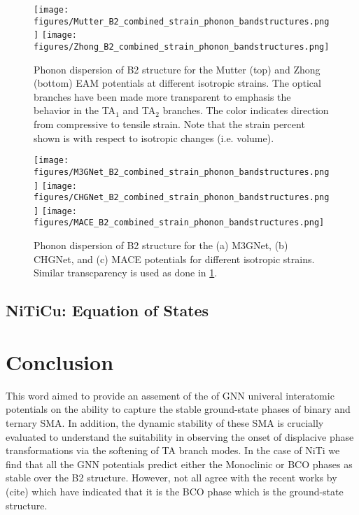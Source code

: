 \documentclass[preprint]{elsarticle}
\begin{document}
\begin{figure}[ht!]
    \begin{centering}
        \texttt{[image: figures/Mutter\_B2\_combined\_strain\_phonon\_bandstructures.png]}
        \vspace{1mm}
        \texttt{[image: figures/Zhong\_B2\_combined\_strain\_phonon\_bandstructures.png]}
        \caption{
           Phonon dispersion of B2 structure for the Mutter (top) and Zhong (bottom)  EAM potentials at different isotropic strains. The optical branches have been made more transparent to emphasis the behavior in the TA$_1$ and TA$_2$ branches. The color indicates direction from compressive to tensile strain. Note that the strain percent shown is with respect to isotropic changes (i.e. volume). 
        }
        \label{fig:mutter_zhong_phonon_b2}
    \end{centering}
\end{figure}



\begin{figure}[ht!]
    \begin{centering}
      \texttt{[image: figures/M3GNet\_B2\_combined\_strain\_phonon\_bandstructures.png]}
      \vspace{1mm}
      \texttt{[image: figures/CHGNet\_B2\_combined\_strain\_phonon\_bandstructures.png]}
      \vspace{1mm}
      \texttt{[image: figures/MACE\_B2\_combined\_strain\_phonon\_bandstructures.png]}
      \caption{
        Phonon dispersion of B2 structure for the (a) M3GNet, (b) CHGNet, and (c) MACE potentials for different isotropic strains. Similar transcparency is used as done in \ref{fig:mutter_zhong_phonon_b2}.
      }
      \label{fig:gnn_phonon_b2}
    \end{centering}
\end{figure}



\subsection{NiTiCu: Equation of States}


\section{Conclusion}
\label{sec:conclusion}
This word aimed to provide an assement of the of GNN univeral interatomic potentials on the ability to capture the stable ground-state phases of binary and ternary SMA. In addition, the dynamic stability of these SMA is crucially evaluated to understand the suitability in observing the onset of displacive phase transformations via the softening of TA branch modes. In the case of NiTi we find that all the GNN potentials predict either the Monoclinic or BCO phases as stable over the B2 structure. However, not all agree with the recent works by (cite) which have indicated that it is the BCO phase which is the ground-state structure.
\end{document}
